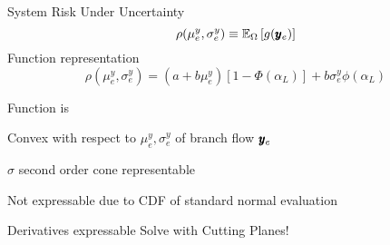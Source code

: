 \begin{frame}{System Risk Under Uncertainty}
\vspace{10pt}
\begin{equation*}
\rho(\mu^y_e,\sigma^y_e) \equiv \mathbb{E}_{\Omega} \left[ g(\pmb{y}_e) \right]
\end{equation*}
\EBR
Function representation
\[ \rho(\mu^y_e,\sigma^y_e) = (a + b \mu^y_e)\left[ 1 - \Phi(\alpha_L) \right]  + b \sigma^y_e \phi(\alpha_L) \]

Function is
\pause
\bi
\item Convex with respect to $\mu^y_e, \sigma^y_e$ of branch flow $\pmb{y}_e$
\bi
\item $\sigma$ second order cone representable
\ei
\item Not expressable due to CDF of standard normal evaluation
\bi
\item Derivatives expressable
\ei
\ei
\pause
Solve with \alert{Cutting Planes!}



\end{frame}